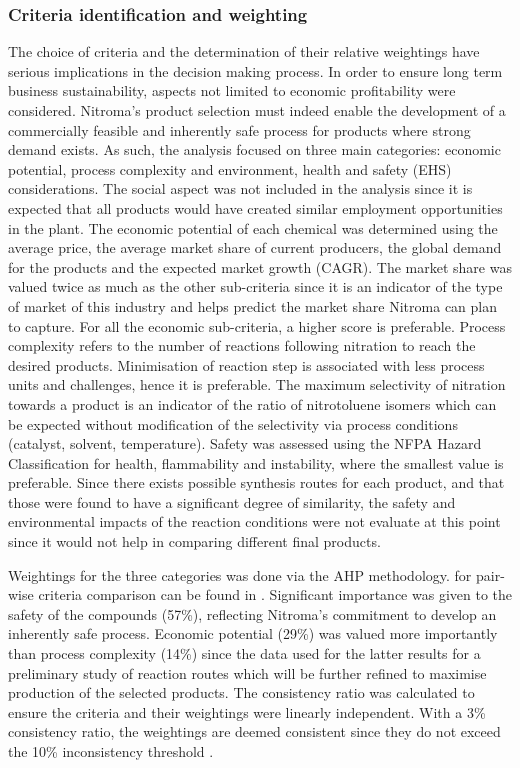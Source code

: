 \subsubsection{Criteria identification and weighting}

The choice of criteria and the determination of their relative weightings have serious implications in the decision making process. In order to ensure long term business sustainability, aspects not limited to economic profitability were considered. Nitroma's product selection must indeed enable the development of a commercially feasible and inherently safe process for products where strong demand exists. As such, the analysis focused on three main categories: economic potential, process complexity and environment, health and safety (EHS) considerations. The social aspect was not included in the analysis since it is expected that all products would have created similar employment opportunities in the plant. 
The economic potential of each chemical was determined using the average price, the average market share of current producers, the global demand for the products and the expected market growth (CAGR). The market share was valued twice as much as the other sub-criteria since it is an indicator of the type of market of this industry and helps predict the market share Nitroma can plan to capture. For all the economic sub-criteria, a higher score is preferable. Process complexity refers to the number of reactions following nitration to reach the desired products. Minimisation of reaction step is associated with less process units and challenges, hence it is preferable. The maximum selectivity of nitration towards a product is an indicator of the ratio of nitrotoluene isomers which can be expected without modification of the selectivity via process conditions (catalyst, solvent, temperature). Safety was assessed using the NFPA Hazard Classification for health, flammability and instability, where the smallest value is preferable. Since there exists possible synthesis routes for each product, and that those were found to have a significant degree of similarity, the safety and environmental impacts of the reaction conditions were not evaluate at this point since it would not help in comparing different final products. 

Weightings for the three categories was done via the AHP methodology.  for pair-wise criteria comparison can be found in . Significant importance was given to the safety of the compounds (57\%), reflecting Nitroma's commitment to develop an inherently safe process. Economic potential (29\%) was valued more importantly than process complexity (14\%) since the data used for the latter results for a preliminary study of reaction routes which will be further refined to maximise production of the selected products. The consistency ratio was calculated to ensure the criteria and their weightings were linearly independent. With a 3\% consistency ratio, the weightings are deemed consistent since they do not exceed the 10\% inconsistency threshold \cite{saaty_analytic_1987}.


